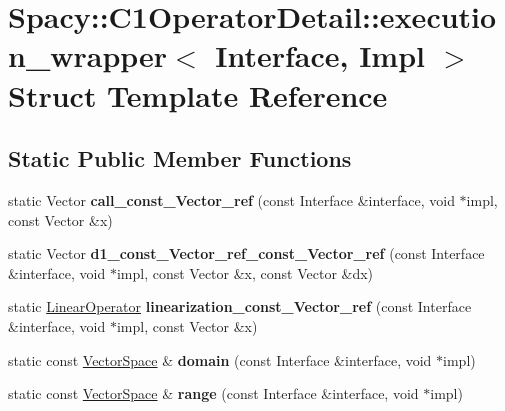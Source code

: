 \hypertarget{structSpacy_1_1C1OperatorDetail_1_1execution__wrapper}{\section{\-Spacy\-:\-:\-C1\-Operator\-Detail\-:\-:execution\-\_\-wrapper$<$ \-Interface, \-Impl $>$ \-Struct \-Template \-Reference}
\label{structSpacy_1_1C1OperatorDetail_1_1execution__wrapper}
}
\subsection*{\-Static \-Public \-Member \-Functions}
\begin{DoxyCompactItemize}
\item 
\hypertarget{structSpacy_1_1C1OperatorDetail_1_1execution__wrapper_a95bc9ec65a33dcfc0922fe9781ef35e6}{static \-Vector {\bfseries call\-\_\-const\-\_\-\-Vector\-\_\-ref} (const \-Interface \&interface, void $\ast$impl, const \-Vector \&x)}\label{structSpacy_1_1C1OperatorDetail_1_1execution__wrapper_a95bc9ec65a33dcfc0922fe9781ef35e6}

\item 
\hypertarget{structSpacy_1_1C1OperatorDetail_1_1execution__wrapper_a3b5cde4059542136fe3addbde2876101}{static \-Vector {\bfseries d1\-\_\-const\-\_\-\-Vector\-\_\-ref\-\_\-const\-\_\-\-Vector\-\_\-ref} (const \-Interface \&interface, void $\ast$impl, const \-Vector \&x, const \-Vector \&dx)}\label{structSpacy_1_1C1OperatorDetail_1_1execution__wrapper_a3b5cde4059542136fe3addbde2876101}

\item 
\hypertarget{structSpacy_1_1C1OperatorDetail_1_1execution__wrapper_ad3ef9dfcc07ca54dcb63d103c5de13a5}{static \hyperlink{classSpacy_1_1LinearOperator}{\-Linear\-Operator} {\bfseries linearization\-\_\-const\-\_\-\-Vector\-\_\-ref} (const \-Interface \&interface, void $\ast$impl, const \-Vector \&x)}\label{structSpacy_1_1C1OperatorDetail_1_1execution__wrapper_ad3ef9dfcc07ca54dcb63d103c5de13a5}

\item 
\hypertarget{structSpacy_1_1C1OperatorDetail_1_1execution__wrapper_a2d6b86fbb21628b7710fbc7deb53cffc}{static const \hyperlink{classSpacy_1_1VectorSpace}{\-Vector\-Space} \& {\bfseries domain} (const \-Interface \&interface, void $\ast$impl)}\label{structSpacy_1_1C1OperatorDetail_1_1execution__wrapper_a2d6b86fbb21628b7710fbc7deb53cffc}

\item 
\hypertarget{structSpacy_1_1C1OperatorDetail_1_1execution__wrapper_a12133bfd1903274cdd97365248057abf}{static const \hyperlink{classSpacy_1_1VectorSpace}{\-Vector\-Space} \& {\bfseries range} (const \-Interface \&interface, void $\ast$impl)}\label{structSpacy_1_1C1OperatorDetail_1_1execution__wrapper_a12133bfd1903274cdd97365248057abf}

\end{DoxyCompactItemize}
